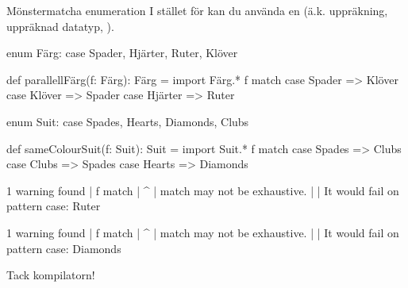 \begin{Slide}{Mönstermatcha enumeration}\SlideFontSmall
I stället för  kan du använda en  (ä.k. uppräkning, uppräknad datatyp, ).
\ifswedish
\begin{Code}
enum Färg:
  case Spader, Hjärter, Ruter, Klöver
  
def parallellFärg(f: Färg): Färg = 
  import Färg.*
  f match 
    case Spader  => Klöver
    case Klöver  => Spader
    case Hjärter => Ruter
\end{Code}
\else
\begin{Code}
enum Suit:
  case Spades, Hearts, Diamonds, Clubs
  
def sameColourSuit(f: Suit): Suit = 
  import Suit.*
  f match 
    case Spades  => Clubs
    case Clubs  => Spades
    case Hearts => Diamonds
\end{Code}
\fi{}
\pause
\ifswedish
\begin{REPL}
1 warning found
  |  f match 
  |  ^
  |  match may not be exhaustive.
  |
  |  It would fail on pattern case: Ruter
\end{REPL}
\else
\begin{REPL}
1 warning found
  |  f match 
  |  ^
  |  match may not be exhaustive.
  |
  |  It would fail on pattern case: Diamonds
\end{REPL}
\fi{}
 \code{:)} Tack kompilatorn!
\end{Slide}

